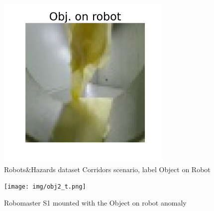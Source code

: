             \begin{figure}[H]
                \centering
                \centerline{\includegraphics[width=0.75\textwidth]{img/labels/obj. on robot.png}}
                \caption{Robots\&Hazards dataset Corridors scenario, label Object on Robot}
                \label{fig:label-obj-on-robot}
            \end{figure}
            
            \begin{figure}[H]
                \centering
                \centerline{\texttt{[image: img/obj2\_t.png]}}
                \caption{Robomaster S1 mounted with the Object on robot anomaly}
                \label{fig:sampei}
            \end{figure}

